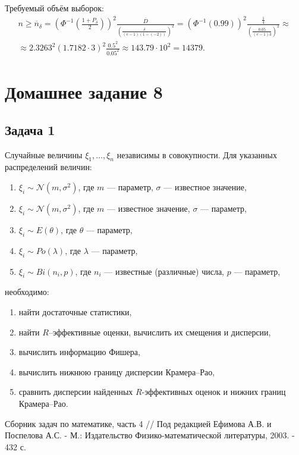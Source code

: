 \documentclass[a4paper,12pt]{article}
\begin{document}
    Требуемый объём выборок:
    \begin{multline*}
        n
        \ge \overline{n}_\delta
        = \left( \Phi^{-1} \left( \frac{1 + P_\delta}{2} \right) \right)^2 \frac{\overline{D}}{\left( \frac{\delta}{(e-1)(1-(-2))} \right)^2}
        = \left( \Phi^{-1} ( 0.99 ) \right)^2 \frac{\frac{1}{4}}{\left( \frac{0.05}{(e-1) 3} \right)^2} \approx \\
        \approx 2.3263^2 \left( 1.7182 \cdot 3 \right)^2 \frac{0.5^2}{0.05^2}
        \approx 143.79\cdot 10^2
        = 14 379 .
    \end{multline*}
\fi

\section*{Домашнее задание 8}

\subsection*{Задача 1}

Случайные величины $\xi_1, \dots, \xi_n$ независимы в совокупности. Для указанных распределений величин:
\begin{enumerate}
    \item $\xi_i \sim \mathcal{N}(m, \sigma^2)$, где $m$ --- параметр, $\sigma$ --- известное значение,
    \item $\xi_i \sim \mathcal{N}(m, \sigma^2)$, где $m$ --- известное значение, $\sigma$ --- параметр,
    \item $\xi_i \sim E(\theta)$, где $\theta$ --- параметр,
    \item $\xi_i \sim Po(\lambda)$, где $\lambda$ --- параметр,
    \item $\xi_i \sim Bi(n_i, p)$, где $n_i$ --- известные (различные) числа, $p$ --- параметр,
\end{enumerate}
необходимо:
\begin{enumerate}
    \item найти достаточные статистики,
    \item найти $R$--эффективные оценки, вычислить их смещения и дисперсии,
    \item вычислить информацию Фишера,
    \item вычислить нижнюю границу дисперсии Крамера--Рао,
    \item сравнить дисперсии найденных $R$-эффективных оценок и нижних границ Крамера--Рао.
\end{enumerate}

\begin{thebibliography}{1}
     Сборник задач по математике, часть 4 // Под редакцией Ефимова А.В. и Поспелова А.С. - М.: Издательство Физико-математической
    литературы, 2003. - 432 с.
\end{thebibliography}
\end{document}

